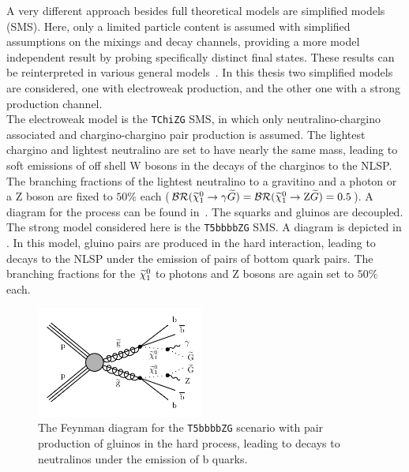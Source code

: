 A very different approach besides full theoretical models are simplified models (SMS)\cite{SMS}. Here, only a limited particle content is assumed with simplified assumptions on the mixings and decay channels, providing a more model independent result by probing specifically distinct final states. These results can be reinterpreted in various general models~\cite{SMSReInt}. In this thesis two simplified models are considered, one with electroweak production, and the other one with a strong production channel.\\
The electroweak model is the \texttt{TChiZG} SMS, in which only neutralino-chargino associated and chargino-chargino pair production is assumed. The lightest chargino and lightest neutralino are set to have nearly the same mass, leading to soft emissions of off shell W bosons in the decays of the charginos to the NLSP. The branching fractions of the lightest neutralino to a gravitino and a photon or a Z boson are fixed to $50\%$ each ($\mathcal{BR}(\widetilde{\chi}^{0}_{1}\to\gamma\widetilde{G})=\mathcal{BR}(\widetilde{\chi}^{0}_{1}\to\mathrm{Z}\widetilde{G})=0.5$). A diagram for the process can be found in~. The squarks and gluinos are decoupled.\\
The strong model considered here is the \texttt{T5bbbbZG} SMS. A diagram is depicted in . In this model, gluino pairs are produced in the hard interaction, leading to decays to the NLSP under the emission of pairs of bottom quark pairs. The branching fractions for the $\widetilde{\chi}^{0}_{1}$ to photons and Z bosons are again set to $50\%$ each.

\begin{figure}[tbp]
 \centering
 \includegraphics[width=0.49\textwidth]{figures/signal/T5bbbbZG-crop}
 \caption{The Feynman diagram for the \texttt{T5bbbbZG} scenario with pair production of gluinos in the hard process, leading to decays to neutralinos under the emission of b quarks.}
 \label{fig:strongSMS}
\end{figure}


